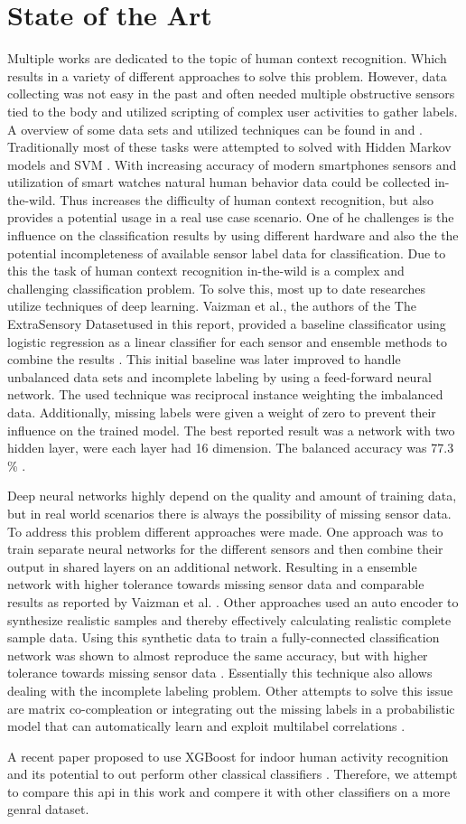 \section{State of the Art}
Multiple works are dedicated to the topic of human context recognition. Which results in a variety of different approaches to solve this problem. However, data collecting was not easy in the past and often needed multiple obstructive sensors tied to the body and utilized scripting of complex user activities to gather labels. A overview of some data sets and utilized techniques can be found in \cite{Ramasamy18} and \cite{Lara13}. Traditionally most of these tasks were attempted to solved with Hidden Markov models \cite{Lee11} and SVM \cite{Anguita12}. 
With increasing accuracy of modern smartphones sensors and utilization of smart watches natural human behavior data could be collected in-the-wild. Thus increases the difficulty of human context recognition, but also provides a potential usage in a real use case scenario.  One of he challenges is the influence on the classification results by using different hardware \cite{Stisen15} and also the the potential incompleteness of available sensor label data for classification. Due to this the task of human context recognition in-the-wild is a complex and challenging classification problem. 
To solve this, most up to date researches utilize techniques of deep learning. Vaizman et al., the authors of the \gl The ExtraSensory Dataset\gr  used in this report, provided a baseline classificator using logistic regression as a linear classifier for each sensor and ensemble methods to combine the results \cite{Vaizman17}. This initial baseline was later improved to handle unbalanced data sets and incomplete labeling by using a feed-forward neural network. The used technique was reciprocal instance weighting the imbalanced data. Additionally, missing labels were given a weight of zero to prevent their influence on the trained model. The best reported result was a network with two hidden layer, were each layer had 16 dimension. The balanced accuracy was 77.3 \% \cite{Vaizman18}. 

Deep neural networks highly depend on the quality and amount of training data, but in real world scenarios there is always the possibility of missing sensor data. To address this problem different approaches were made. One approach was to train separate neural networks for the different sensors and then combine their output in shared layers on an additional network. Resulting in a ensemble network with higher tolerance towards missing sensor data and comparable results as reported by Vaizman et al. \cite{Saeed18}. Other approaches used an auto encoder to synthesize realistic samples and thereby effectively calculating realistic complete sample data. Using this synthetic data to train a fully-connected classification network was shown to almost reproduce the same accuracy, but with higher tolerance towards missing sensor data \cite{Saeed18-2}. Essentially this technique also allows dealing with the incomplete labeling problem. Other attempts to solve this issue are matrix co-compleation \cite{Xu18} or integrating out the missing labels in a probabilistic model that can automatically learn and exploit multilabel correlations \cite{Bi14}.

A recent paper proposed to use XGBoost for indoor human activity recognition and its potential to out perform other classical classifiers \cite{Zhang19}. Therefore, we attempt to compare this api in this work and compere it with other classifiers on a more genral dataset. 
